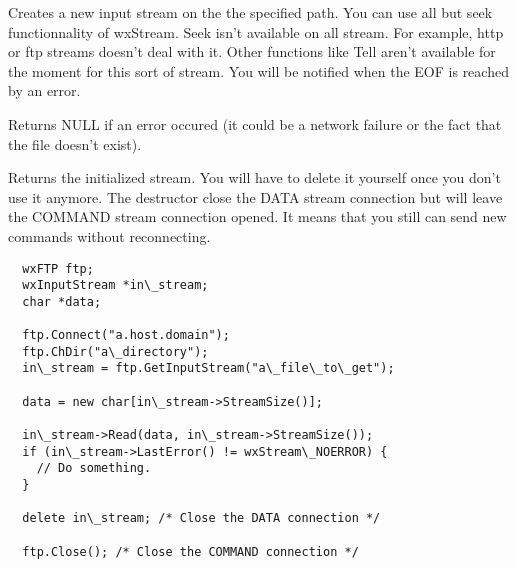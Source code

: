 
\label{wxftpgetinput}


Creates a new input stream on the the specified path. You can use all but seek
functionnality of wxStream. Seek isn't available on all stream. For example,
http or ftp streams doesn't deal with it. Other functions like Tell
aren't available for the moment for this sort of stream.
You will be notified when the EOF is reached by an error.


Returns NULL if an error occured (it could be a network failure or the fact
that the file doesn't exist).

Returns the initialized stream. You will have to delete it yourself once you
don't use it anymore. The destructor close the DATA stream connection but
will leave the COMMAND stream connection opened. It means that you still
can send new commands without reconnecting.


\begin{verbatim}
  wxFTP ftp;
  wxInputStream *in\_stream;
  char *data;

  ftp.Connect("a.host.domain");
  ftp.ChDir("a\_directory");
  in\_stream = ftp.GetInputStream("a\_file\_to\_get");

  data = new char[in\_stream->StreamSize()];

  in\_stream->Read(data, in\_stream->StreamSize());
  if (in\_stream->LastError() != wxStream\_NOERROR) {
    // Do something.
  }

  delete in\_stream; /* Close the DATA connection */

  ftp.Close(); /* Close the COMMAND connection */
\end{verbatim}


